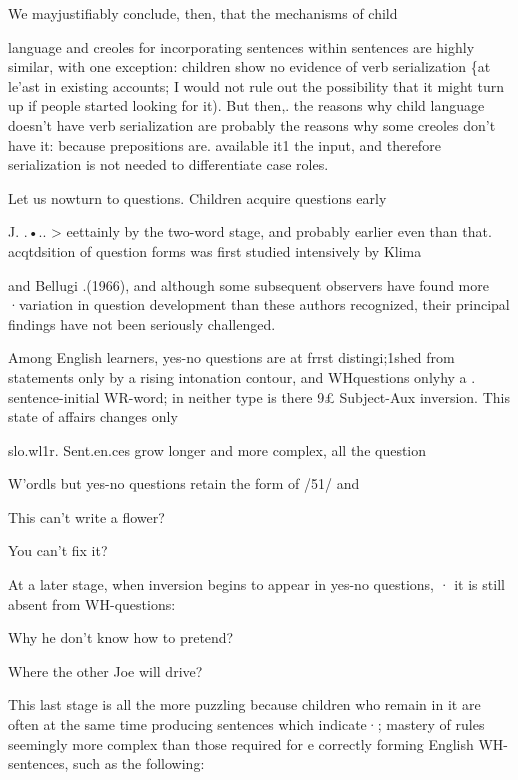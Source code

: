 We mayjustifiably conclude, then, that the mechanisms of child

language and creoles for incorporating sentences within sentences are highly similar, with one exception: children show no evidence of verb serialization \{at le'ast in existing accounts; I would not rule out the possibility that it might turn up if people started looking for it). But then,. the reasons why child language doesn't have verb serialization are probably the reasons why some creoles don't have it: because prepositions are. available it1 the input, and therefore serialization is not needed to differentiate case roles.

Let us nowturn to questions. Children acquire questions early\-

J. .•.. {\textgreater} eettainly by the two-word stage, and probably earlier even than that. acqtdsition of question forms was first studied intensively by Klima

and Bellugi .(1966), and although some subsequent observers have found more ·variation in question development than these authors recognized, their principal findings have not been seriously challenged.

Among English learners, yes-no questions are at frrst distin\-gi;1shed from statements only by a rising intonation contour, and WH\-questions onlyhy a . sentence-initial WR-word; in neither type is there 9£ Subject-Aux inversion. This state of affairs changes only

slo.wl1r. Sent.en.ces grow longer and more complex, all the question

W'ordls but yes-no questions retain the form of /51/ and


\ea\label{ex:51}
 This can't write a flower?
\glt
\z

\ea\label{ex:52}
 You can't fix it?
\glt
\z

At a later stage, when inversion begins to appear in yes-no questions, · it is still absent from WH-questions:

\ea\label{ex:53}
 Why he don't know how to pretend?
\glt
\z

\ea\label{ex:54}
 Where the other Joe will drive?
\glt
\z

This last stage is all the more puzzling because children who remain in it are often at the same time producing sentences which indicate·; mastery of rules seemingly more complex than those required for e correctly forming English WH-sentences, such as the following:


